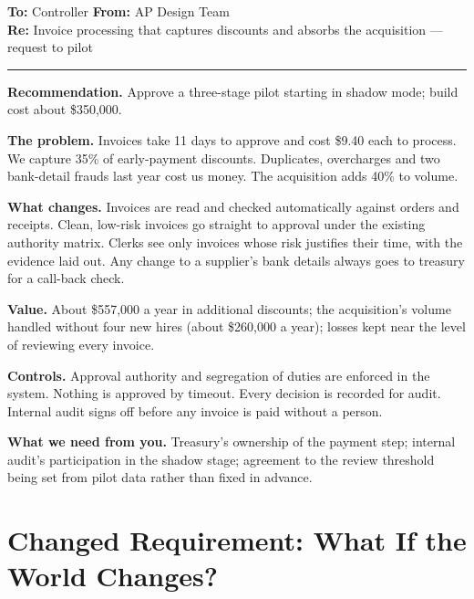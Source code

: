\begin{tcolorbox}[colback=white, colframe=black!60, boxrule=0.6pt, arc=1pt, left=10pt, right=10pt, top=8pt, bottom=8pt, fontupper=\small]
\textbf{To:} Controller \hfill \textbf{From:} AP Design Team\\
\textbf{Re:} Invoice processing that captures discounts and absorbs the acquisition --- request to pilot

\smallskip\hrule\smallskip

\textbf{Recommendation.} Approve a three-stage pilot starting in shadow mode; build cost about \$350{,}000.

\textbf{The problem.} Invoices take 11 days to approve and cost \$9.40 each to process. We capture 35\% of early-payment discounts. Duplicates, overcharges and two bank-detail frauds last year cost us money. The acquisition adds 40\% to volume.

\textbf{What changes.} Invoices are read and checked automatically against orders and receipts. Clean, low-risk invoices go straight to approval under the existing authority matrix. Clerks see only invoices whose risk justifies their time, with the evidence laid out. Any change to a supplier's bank details always goes to treasury for a call-back check.

\textbf{Value.} About \$557{,}000 a year in additional discounts; the acquisition's volume handled without four new hires (about \$260{,}000 a year); losses kept near the level of reviewing every invoice.

\textbf{Controls.} Approval authority and segregation of duties are enforced in the system. Nothing is approved by timeout. Every decision is recorded for audit. Internal audit signs off before any invoice is paid without a person.

\textbf{What we need from you.} Treasury's ownership of the payment step; internal audit's participation in the shadow stage; agreement to the review threshold being set from pilot data rather than fixed in advance.
\end{tcolorbox}

\section{Changed Requirement: What If the World Changes?}
\label{sec:inv-changed}


